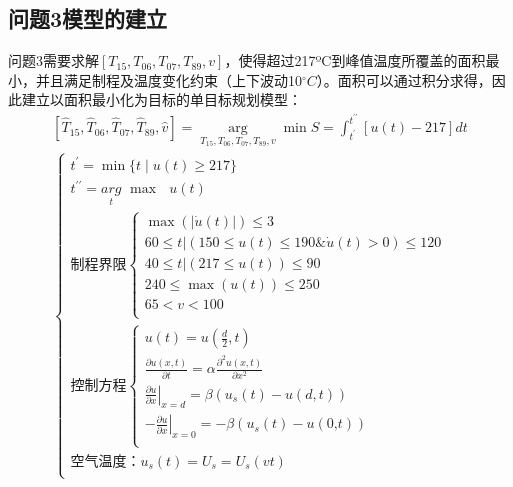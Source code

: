 \documentclass[withoutpreface,bwprint]{cumcmthesis} %
\begin{document}
	\subsection{问题3模型的建立}
	问题3需要求解$[T_{15}, T_{06}, T_{0 7}, T_{89}, v]$，使得超过217ºC到峰值温度所覆盖的面积最小，并且满足制程及温度变化约束（上下波动10$^\circ C$）。面积可以通过积分求得，因此建立以面积最小化为目标的单目标规划模型：
\begin{equation}\label{p3}
\begin{gathered}
\left[\hat{T}_{15}, \hat{T}_{06}, \hat{T}_{07}, \hat{T}_{89}, \hat{v}\right]=\underset{T_{\mathrm{15}}, T_{06}, T_{0 7}, T_{89}, v} \arg \min S = \int_{t^{\prime}}^{t^{\prime \prime}}[u(t)-217] d t
\\
\begin{cases}
t^{\prime}=\min\text{\{}t\mid u\left( t \right) \ge \text{217\}}\\
t^{\prime \prime}=\underset{t}{arg}\,\,\max\text{ }u\left( t \right)\\
\text{制程界限}\begin{cases}
\max \left( \left| \dot{u}\left( t \right) \right| \right) \leqslant 3\\
60\leqslant \left. t \right|\left( 150\leqslant u\left( t \right) \leqslant \text{190\&}\dot{u}\left( t \right) >0 \right) \leqslant 120\\
40\leqslant \left. t \right|\left( 217\leqslant u\left( t \right) \right) \leqslant 90\\
240\leqslant \max \left( u\left( t \right) \right) \leqslant 250\\
65<v<100\\
\end{cases}\\
\text{控制方程}\left\{ \begin{array}{l}
u\left( t \right) =u\left( \frac{d}{2},t \right)\\
\frac{\partial u\left( x,t \right)}{\partial t}=\alpha \frac{\partial ^2u\left( x,t \right)}{\partial x^2}\\
\left. \frac{\partial u}{\partial x} \right|_{x=d}=\beta \left( u_s\left( t \right) -u\left( d,t \right) \right)\\
-\left. \frac{\partial u}{\partial x} \right|_{x=0}=-\beta \left( u_s\left( t \right) -u\left( \text{0,}t \right) \right)\\
\end{array} \right.\\
\text{空气温度：}u_s\left( t \right) =U_s=U_s\left( vt \right)\\

\end{cases}
\end{gathered}
\end{equation}
\end{document}
